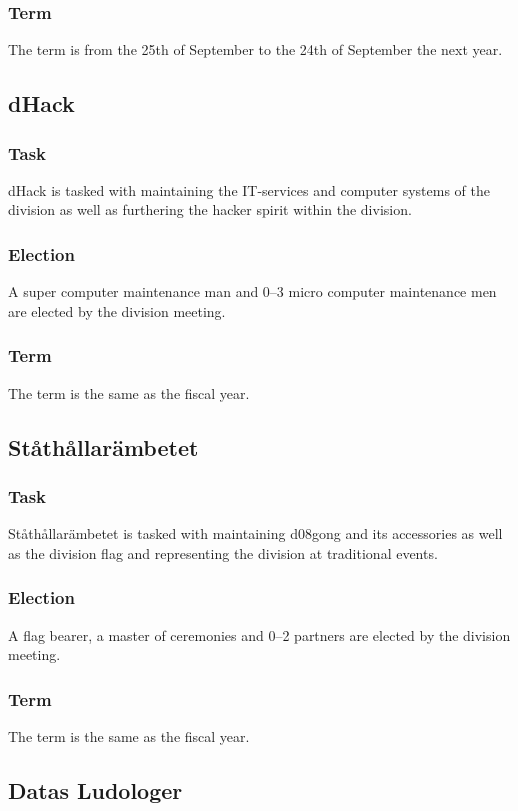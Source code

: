 \subsubsection{Term}
The term is from the 25th of September to the 24th of September the next year. 

\subsection{dHack}
\subsubsection{Task}
dHack is tasked with maintaining the IT-services and computer systems of the division as well as furthering the hacker spirit within the division. 
\subsubsection{Election}
A super computer maintenance man and 0--3 micro computer maintenance men are elected by the division meeting. 
\subsubsection{Term}
The term is the same as the fiscal year. 

\subsection{Ståthållarämbetet}
\subsubsection{Task}
Ståthållarämbetet is tasked with maintaining d08gong and its accessories as well as the division flag and representing the division at traditional events. 
\subsubsection{Election}
A flag bearer, a master of ceremonies and 0--2 partners are elected by the division meeting. 
\subsubsection{Term}
The term is the same as the fiscal year. 

\subsection{Datas Ludologer}

